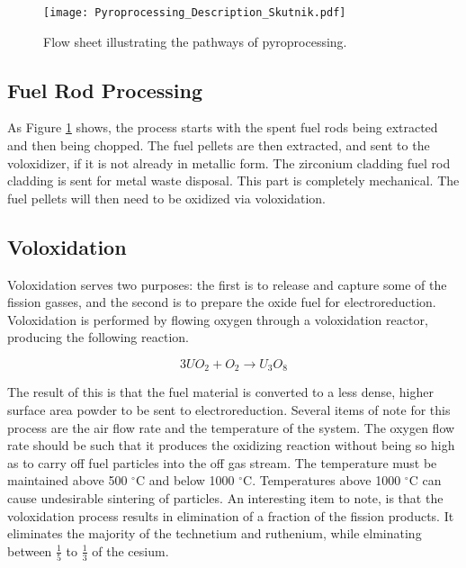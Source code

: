 \begin{figure}[h]
  \centering
  \texttt{[image: Pyroprocessing\_Description\_Skutnik.pdf]}\\
  \caption{Flow sheet illustrating the pathways of pyroprocessing.}\label{pyro_flow}
\end{figure} 

\newpage

\subsection{Fuel Rod Processing}
As Figure \ref{pyro_flow} shows, the process starts with the spent fuel rods being extracted and then being chopped. The fuel pellets are then extracted, and sent to the voloxidizer, if it is not already in metallic form. The zirconium cladding fuel rod cladding is sent for metal waste disposal. This part is completely mechanical. The fuel pellets will then need to be oxidized via voloxidation. 

\subsection{Voloxidation}

Voloxidation serves two purposes: the first is to release and capture some of the fission gasses, and the second is to prepare the oxide fuel for electroreduction. Voloxidation is performed by flowing oxygen through a voloxidation reactor, producing the following reaction.

\begin{equation}
3UO_2 + O_2 \rightarrow U_3O_8
\end{equation}

The result of this is that the fuel material is converted to a less dense, higher surface area powder to be sent to electroreduction. Several items of note for this process are the air flow rate and the temperature of the system. The oxygen flow rate should be such that it produces the oxidizing reaction without being so high as to carry off fuel particles into the off gas stream. The temperature must be maintained above 500 $^{\circ}$C and below 1000 $^{\circ}$C. Temperatures above 1000 $^{\circ}$C can cause undesirable sintering of particles. An interesting item to note, is that the voloxidation process results in elimination of a fraction of the fission products. It eliminates the majority of the technetium and ruthenium, while elminating between $\frac{1}{5}$ to $\frac{1}{3}$ of the cesium.


